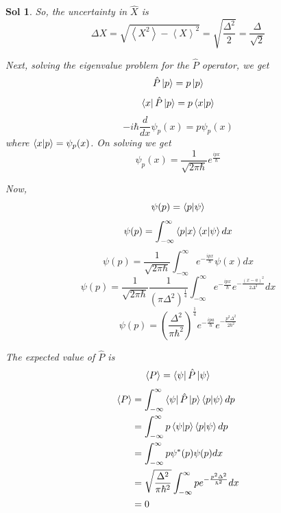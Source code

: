\documentclass[12pt,a4paper]{report}
\newcommand{\der}[2]{\frac{d#1}{d#2}}
\newcommand{\expected}[1]{\left \langle #1 \right \rangle}
\newtheorem*{solution}{Sol}
\begin{document}
\begin{solution}
    So, the uncertainty in $\hat{X}$ is
    \begin{equation*}
        \Delta X = \sqrt{\expected{X^2} - \expected{X}^2} = \sqrt{\frac{\Delta^2}{2}} = \frac{\Delta}{\sqrt{2}}
    \end{equation*}

    Next, solving the eigenvalue problem for the $\hat{P}$ operator, we get
    \begin{equation*}
        \hat{P}\ket{p} = p\ket{p}
    \end{equation*}
    \begin{equation*}
        \bra{x}\hat{P}\ket{p} = p\bra{x}\ket{p}
    \end{equation*}
    \begin{equation*}
        -i\hbar \der{}{x} \psi_p(x) = p\psi_p(x)
    \end{equation*}
    where $\bra{x}\ket{p} = \psi_p(x)$. On solving we get
    \begin{equation*}
        \psi_p(x) = \frac{1}{\sqrt{2\pi\hbar}} e^{\frac{ipx}{\hbar}}
    \end{equation*}

    Now,
    \begin{equation*}
        \psi(p) = \bra{p}\ket{\psi}
    \end{equation*}
    \begin{equation*}
        \psi(p) = \int_{-\infty}^{\infty}\bra{p}\ket{x}\bra{x}\ket{\psi} dx
    \end{equation*}
    \begin{equation*}
        \psi(p) = \frac{1}{\sqrt{2\pi\hbar}}\int_{-\infty}^{\infty}e^{-\frac{ipx}{\hbar}}\psi(x) dx
    \end{equation*}
    \begin{equation*}
        \psi(p) = \frac{1}{\sqrt{2\pi\hbar}}\frac{1}{(\pi \Delta^2)^{\frac{1}{4}}}\int_{-\infty}^{\infty}e^{-\frac{ipx}{\hbar}} e^{-\frac{(x-a)^2}{2\Delta^2}} dx
    \end{equation*}
    \begin{equation*}
        \psi(p) = \left( \frac{\Delta^2}{\pi \hbar^2} \right)^{\frac{1}{4}} e^{-\frac{ipa}{\hbar}}e^{-\frac{p^2\Delta^2}{2\hbar^2}}
    \end{equation*}

    The expected value of $\hat{P}$ is
    \begin{equation*}
        \expected{P} = \bra{\psi}\hat{P}\ket{\psi}
    \end{equation*}
    \begin{align*}
        \expected{P} &= \int_{-\infty}^{\infty}\bra{\psi}\hat{P}\ket{p}\bra{p}\ket{\psi} dp \\
        &= \int_{-\infty}^{\infty}p\bra{\psi}\ket{p}\bra{p}\ket{\psi} dp \\
        &= \int_{-\infty}^{\infty}p\psi^*(p)\psi(p) dx \\
        &= \sqrt{\frac{\Delta^2}{\pi \hbar^2}}\int_{-\infty}^{\infty}pe^{-\frac{p^2\Delta^2}{\hbar^2}} dx \\
        &= 0
    \end{align*}


\end{solution}
\end{document}
